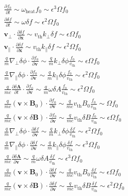 \documentclass[
  notoc %
]{tufte-book}
\begin{document}
\[
\begin{aligned}
\frac{\partial f_0}{\partial t} \sim \omega_{\text{heat}}f_0 \sim \epsilon^3\Omega f_0 \\
\frac{\partial \delta f}{\partial t}\sim \omega\delta f\sim \epsilon^2\Omega f_0 \\
\mathbf{v}_\perp\cdot\frac{\partial \delta f}{\partial\mathbf{x}}\sim v_{\text{th}}k_\perp\delta f\sim\epsilon\Omega f_0 \\
\mathbf{v}_\parallel\cdot\frac{\partial \delta f}{\partial\mathbf{x}}\sim v_{\text{th}}k_\parallel\delta f\sim\epsilon^2\Omega f_0 \\
\frac{q}{m}\nabla_\perp\delta\phi\cdot\frac{\partial f_0}{\partial \mathbf{v}}\sim \frac{q}{m}k_\perp \delta\phi\frac{f_0}{v_{\text{th}}} \sim \epsilon\Omega f_0 \\
\frac{q}{m}\nabla_\parallel\delta\phi\cdot\frac{\partial f_0}{\partial \mathbf{v}}\sim \frac{q}{m}k_\parallel \delta\phi\frac{f_0}{v_{\text{th}}} \sim \epsilon^2\Omega f_0 \\
\frac{q}{mc}\frac{\partial\delta\mathbf{A}}{\partial t}\cdot\frac{\partial f_0}{\partial\mathbf{v}}\sim\frac{q}{m}\omega\delta A\frac{f_0}{v_{\text{th}}}\sim \epsilon^2\Omega f_0 \\
\frac{q}{mc}(\mathbf{v}\times\mathbf{B}_0)\cdot\frac{\partial f_0}{\partial \mathbf{v}}\sim\frac{q}{mc}v_{\text{th}}B_0 \frac{f_0}{v_{\text{th}}}\sim \Omega f_0 \\
\frac{q}{mc}(\mathbf{v}\times\delta\mathbf{B})\cdot\frac{\partial f_0}{\partial \mathbf{v}}\sim\frac{q}{mc}v_{\text{th}}\delta B \frac{f_0}{v_{\text{th}}}\sim \epsilon\Omega f_0 \\
\frac{q}{m}\nabla_\perp \delta\phi\cdot\frac{\partial\delta f}{\partial\mathbf{v}}\sim\frac{q}{m}k_\perp\delta\phi\frac{\delta f}{v_{\text{th}}}\sim\epsilon^2\Omega f_0 \\
\frac{q}{m}\nabla_\parallel \delta\phi\cdot\frac{\partial\delta f}{\partial\mathbf{v}}\sim\frac{q}{m}k_\parallel\delta\phi\frac{\delta f}{v_{\text{th}}}\sim\epsilon^3\Omega f_0 \\
\frac{q}{mc}\frac{\partial\delta\mathbf{A}}{\partial\mathbf{v}}\sim\frac{q}{m}\omega\delta A\frac{\delta f}{v_{\text{th}}}\sim \epsilon^3\Omega f_0 \\
\frac{q}{mc}(\mathbf{v}\times\mathbf{B}_0)\cdot\frac{\partial \delta f}{\partial\mathbf{v}}\sim\frac{q}{mc}v_{\text{th}}B_0\frac{\delta f}{v_{\text{th}}}\sim\epsilon\Omega f_0 \\
\frac{q}{mc}(\mathbf{v}\times\delta\mathbf{B})\cdot\frac{\partial \delta f}{\partial\mathbf{v}}\sim\frac{q}{mc}v_{\text{th}}\delta B\frac{\delta f}{v_{\text{th}}}\sim\epsilon^2\Omega f_0
\end{aligned}
\]
\end{document}
